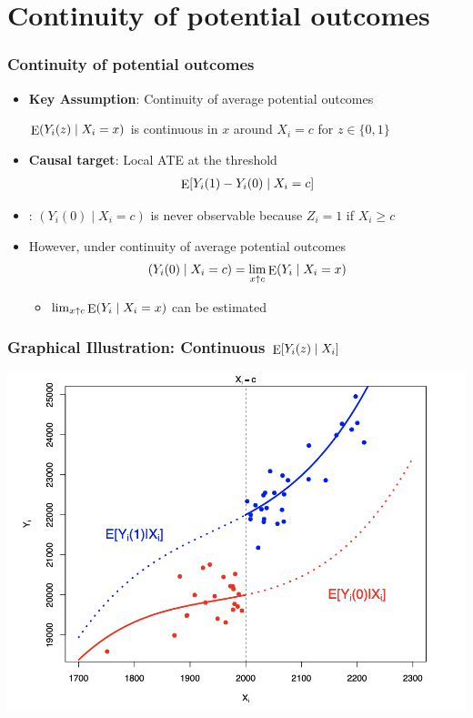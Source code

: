 \documentclass[table, xcolor = {dvipsnames}, 9pt]{beamer}
\theoremstyle{plain}
\newcommand{\mh}[1]{{\color{magenta}{#1}}}
\DeclareMathOperator{\E}{\rm{E}}
\begin{document}
\section{Continuity of potential outcomes}
\begin{frame}
\frametitle{Continuity of potential outcomes} 
\begin{itemize} \vfill
\item {\bf Key Assumption}: \alert{Continuity of average potential outcomes} \vfill
\begin{center} \vfill
$\E(Y_i(z)\mid X_i=x)$ is continuous in $x$ around $X_i = c$
for $z \in \{0, 1\}$
\end{center} \vfill
\item {\bf Causal target}: Local ATE at the threshold \vfill
\begin{align*}
\E[Y_i(1) - Y_i(0) \mid X_i = c]
\end{align*} \vfill
\item \mh{Note}: $\left(Y_i(0) \mid X_i = c\right)$ is never observable because $Z_i = 1$ if $X_i \geq c$ \vfill
\item However, under continuity of average potential outcomes \vfill
\begin{align*}
\left(Y_i(0) \mid X_i = c\right) = \lim_{x\uparrow c}\E(Y_i \mid X_i = x)
\end{align*} \vfill
\begin{itemize} \vfill
\item $\lim_{x\uparrow c}\E(Y_i \mid X_i = x)$ can be estimated \vfill
\end{itemize} \vfill
\end{itemize} \vfill
\end{frame}
\begin{frame}
\frametitle{Graphical Illustration: Continuous $\E[Y_i(z)\mid X_i]$}
\begin{center}
\includegraphics[height=.8\textheight]{figures/R2-2.png}
\end{center}
\end{frame}
\end{document}
